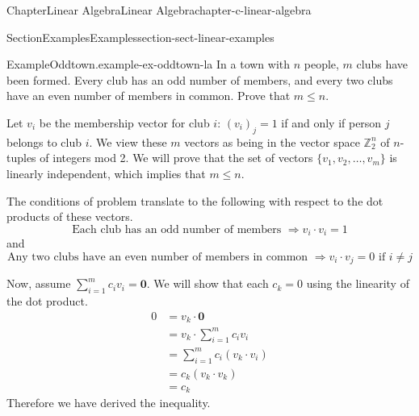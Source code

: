 \documentclass[oneside,10pt,]{book}
\numberwithin{equation}{section}
\renewcommand{\vec}[1]{\mathbf{#1}}
\begin{document}
%
%
\typeout{************************************************}
\typeout{************************************************}
%
\begin{chapterptx}{Chapter}{Linear Algebra}{}{Linear Algebra}{}{}{chapter-c-linear-algebra}
\renewcommand*{\chaptername}{Chapter}
%
%
\typeout{************************************************}
\typeout{************************************************}
%
\begin{sectionptx}{Section}{Examples}{}{Examples}{}{}{section-sect-linear-examples}
\begin{example}{Example}{Oddtown.}{example-ex-oddtown-la}%
In a town with \(n\) people, \(m\) clubs have been formed. Every club has an odd number of members, and every two clubs have an even number of members in common. Prove that \(m \leq  n\).%
\par
Let \(v_i\) be the membership vector for club \(i\):  \((v_i)_j = 1\) if and only if person  \(j\) belongs to club \(i\). We view these \(m\) vectors as being in the vector space \(\mathbb{Z}_2^n\) of \(n\)-tuples of integers mod 2.  We will prove that the set of vectors \(\{v_1, v_2, \dots, v_m\}\) is linearly independent, which implies that \(m \leq  n\).%
\par
The conditions of problem translate to the following with respect to the dot products of these vectors.%
\begin{equation*}
\textrm{Each club has an odd number of members }\Rightarrow  v_i\cdot v_i = 1
\end{equation*}
and%
\begin{equation*}
\textrm{Any two clubs have an even number of members in common }\Rightarrow  v_i\cdot v_j = 0 \textrm{ if }i\neq j
\end{equation*}
%
\par
Now, assume  \(\sum_{i=1}^m c_i v_i = \vec{0}\).  We will show that each \(c_k = 0\) using the linearity of the dot product.%
\begin{equation*}
\begin{split}
0 & = v_k \cdot \vec{0}\\
& = v_k \cdot \sum_{i=1}^m c_i v_i\\
& = \sum_{i=1}^m c_i (v_k \cdot v_i)\\
& = c_k (v_k \cdot v_k)\\
& = c_k
\end{split}
\end{equation*}
Therefore we have derived the inequality.%

\end{example}
\end{sectionptx}
\end{chapterptx}
\end{document}
